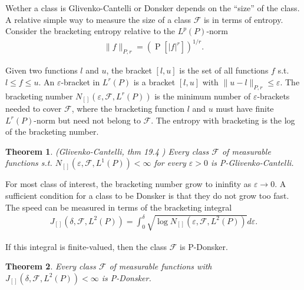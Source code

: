 \documentclass[12pt,a4paper]{article}
\newcommand{\pr}{\mathop{\mathrm{P}}}
\def \mscrF {\mathscr{F}}
\newtheorem{theorem}{Theorem}[section]
\begin{document}
Wether a class is Glivenko-Cantelli or Donsker depends on the ``size'' of the class. A relative
simple way to measure the size of a class $\mscrF$ is in terms of entropy. Consider the bracketing
entropy relative to the $L^p(P)$-norm
\begin{align*}
	\|f\|_{P,r} = (\pr\left[ |f|^r \right])^{1/r}.
\end{align*}

Given two functions $l$ and $u$, the bracket $[l,u]$ is the set of all functions $f$ s.t. $l\le f
\le u$. An $\varepsilon$-bracket in $L^r(P)$ is a bracket $[l,u]$ with $ \|u-l\|_{P,r}\le
\varepsilon$. The bracketing number $N_{[]}(\varepsilon,\mscrF,L^{r}(P))$ is the minimum number of
$\varepsilon$-brackets needed to cover $\mscrF$, where the bracketing function $l$ and $u$ must have
finite $L^r(P)$-norm but need not belong to $\mscrF$. The entropy with bracketing is the log of the
bracketing number.

\begin{theorem}
	(Glivenko-Cantelli, thm 19.4 \citep{vaart})
	Every class $\mscrF$ of measurable functions s.t. $N_{[]}(\varepsilon,\mscrF,L^1(P))<\infty $ for
	every $\varepsilon>0$ is P-Glivenko-Cantelli.
	\label{<++>}
\end{theorem}


For most class of interest, the bracketing number grow to ininfity as $\varepsilon\to 0$. A
sufficient condition for a class to be Donsker is that they do not grow too fast. The speed can be
measured in terms of the bracketing integral
\begin{align*}
	J_{[]}\left( \delta,\mscrF,L^2(P) \right) 
	= \int_{0}^\delta \sqrt{\log N_{[]}\left(
	\varepsilon,\mscrF,L^2(P)
	\right)}d\varepsilon.
\end{align*}

If this integral is finite-valued, then the class $\mscrF$ is P-Donsker.

\begin{theorem}
	Every class $\mscrF$ of measurable functions with $
	J_{[]}\left( \delta,\mscrF,L^2(P) \right) <\infty$  is P-Donsker.
	\label{thm:donsker}
\end{theorem}
\end{document}
